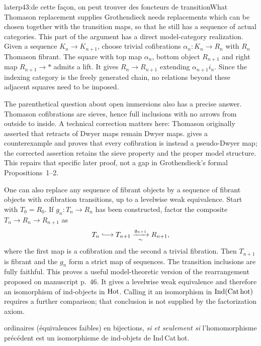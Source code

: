 \begin{dcomment}{later}{p43:de cette façon, on peut trouver des foncteurs de transition}{What Thomason replacement supplies}
Grothendieck needs replacements which can be chosen together with the transition maps, so that he still has a sequence of actual categories. This part of the argument has a direct model-category realization. Given a sequence $K_n\to K_{n+1}$, choose trivial cofibrations $\alpha_n:K_n\to R_n$ with $R_n$ Thomason fibrant. The square with top map $\alpha_n$, bottom object $R_{n+1}$ and right map $R_{n+1}\to *$ admits a lift. It gives $R_n\to R_{n+1}$ extending $\alpha_{n+1}i_n$. Since the indexing category is the freely generated chain, no relations beyond these adjacent squares need to be imposed.

The parenthetical question about open immersions also has a precise answer. Thomason cofibrations are sieves, hence full inclusions with no arrows from outside to inside. A technical correction matters here: Thomason originally asserted that retracts of Dwyer maps remain Dwyer maps. \citet{Cisinski1999Dwyer} gives a counterexample and proves that every cofibration is instead a pseudo-Dwyer map; the corrected assertion retains the sieve property and the proper model structure. This repairs that specific later proof, not a gap in Grothendieck's formal Propositions~1--2.

One can also replace any sequence of fibrant objects by a sequence of fibrant objects with cofibration transitions, up to a levelwise weak equivalence. Start with $T_0=R_0$. If $g_n:T_n\to R_n$ has been constructed, factor the composite $T_n\to R_n\to R_{n+1}$ as
\[
 T_n\lhook\joinrel\longrightarrow T_{n+1}
       \xrightarrow[\sim]{g_{n+1}}R_{n+1},
\]
where the first map is a cofibration and the second a trivial fibration. Then $T_{n+1}$ is fibrant and the $g_n$ form a strict map of sequences. The transition inclusions are fully faithful. This proves a useful model-theoretic version of the rearrangement proposed on manuscript p.~46. It gives a levelwise weak equivalence and therefore an isomorphism of ind-objects in $\mathrm{Hot}$. Calling it an isomorphism in $\operatorname{Ind}(\mathrm{Cat\,hot})$ requires a further comparison; that conclusion is not supplied by the factorization axiom.
\end{dcomment}


\noindent{}%
ordinaires (équivalences faibles) en bijections, \textit{si et seulement si} l'homomorphisme précédent est un isomorphisme de ind-objets de Ind\,Cat\,hot.

